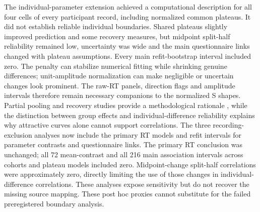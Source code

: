 The individual-parameter extension achieved a computational description for all four cells of every participant record, including normalized common plateaus. It did not establish reliable individual boundaries. Shared plateaus slightly improved prediction and some recovery measures, but midpoint split-half reliability remained low, uncertainty was wide and the main questionnaire links changed with plateau assumptions. Every main refit-bootstrap interval included zero. The penalty can stabilize numerical fitting while shrinking genuine differences; unit-amplitude normalization can make negligible or uncertain changes look prominent. The raw-RT panels, direction flags and amplitude intervals therefore remain necessary companions to the normalized S shapes. Partial pooling and recovery studies provide a methodological rationale \citep{Ahn2011}, while the distinction between group effects and individual-difference reliability \citep{Hedge2018} explains why attractive curves alone cannot support correlations. The three recording-exclusion analyses now include the primary RT models and refit intervals for parameter contrasts and questionnaire links. The primary RT conclusion was unchanged; all 72 mean-contrast and all 216 main association intervals across cohorts and plateau models included zero. Midpoint-change split-half correlations were approximately zero, directly limiting the use of those changes in individual-difference correlations. These analyses expose sensitivity but do not recover the missing source mapping. These post hoc proxies cannot substitute for the failed preregistered boundary analysis.

